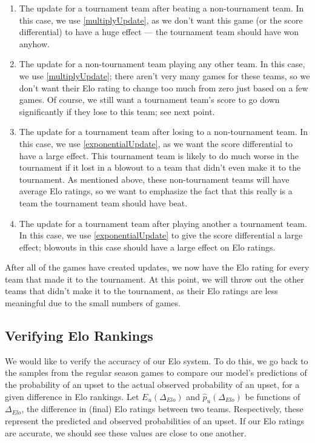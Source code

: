 \documentclass{article}
\begin{document}
\begin{enumerate}
    \item The update for a tournament team after beating a non-tournament team. In this case, we use \autoref{multiplyUpdate}, as we don't want this game (or the score differential) to have a huge effect --- the tournament team should have won anyhow.
    \item The update for a non-tournament team playing any other team. In this case, we use \autoref{multiplyUpdate}; there aren't very many games for these teams, so we don't want their Elo rating to change too much from zero just based on a few games. Of course, we still want a tournament team's score to go down significantly if they lose to this team; see next point.
    \item The update for a tournament team after losing to a non-tournament team. In this case, we use \autoref{exponentialUpdate}, as we want the score differential to have a large effect. This tournament team is likely to do much worse in the tournament if it lost in a blowout to a team that didn't even make it to the tournament. As mentioned above, these non-tournament teams will have average Elo ratings, so we want to emphasize the fact that this really is a team the tournament team should have beat.
    \item The update for a tournament team after playing another a tournament team. In this case, we use \autoref{exponentialUpdate} to give the score differential a large effect; blowouts in this case should have a large effect on Elo ratings. 
\end{enumerate}

After all of the games have created updates, we now have the Elo rating for every team that made it to the tournament. At this point, we will throw out the other teams that didn't make it to the tournament, as their Elo ratings are less meaningful due to the small numbers of games.

\subsection{Verifying Elo Rankings}\label{verify}
We would like to verify the accuracy of our Elo system. To do this, we go back to the samples from the regular season games to compare our model's predictions of the probability of an upset to the actual observed probability of an upset, for a given difference in Elo rankings. Let $E_u(\Delta_{Elo})$ and $\hat{p}_u(\Delta_{Elo})$ be functions of $\Delta_{Elo}$, the difference in (final) Elo ratings between two teams. Respectively, these represent the predicted and observed probabilities of an upset. If our Elo ratings are accurate, we should see these values are close to one another.
\end{document}
